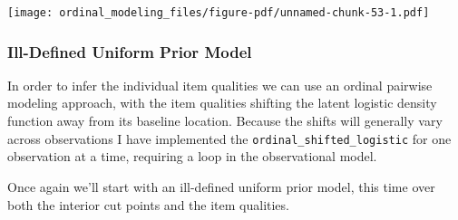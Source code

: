 \documentclass[
  letterpaper,
  DIV=11,
  numbers=noendperiod]{scrartcl}
\newenvironment{Shaded}{\begin{snugshade}}{\end{snugshade}}
\newcommand{\AttributeTok}[1]{\textcolor[rgb]{0.40,0.45,0.13}{#1}}
\newcommand{\ControlFlowTok}[1]{\textcolor[rgb]{0.00,0.23,0.31}{#1}}
\newcommand{\DecValTok}[1]{\textcolor[rgb]{0.68,0.00,0.00}{#1}}
\newcommand{\FloatTok}[1]{\textcolor[rgb]{0.68,0.00,0.00}{#1}}
\newcommand{\FunctionTok}[1]{\textcolor[rgb]{0.28,0.35,0.67}{#1}}
\newcommand{\NormalTok}[1]{\textcolor[rgb]{0.00,0.23,0.31}{#1}}
\newcommand{\SpecialCharTok}[1]{\textcolor[rgb]{0.37,0.37,0.37}{#1}}
\newcommand{\StringTok}[1]{\textcolor[rgb]{0.13,0.47,0.30}{#1}}
\begin{document}
\begin{Shaded}
\end{Shaded}

\texttt{[image: ordinal\_modeling\_files/figure-pdf/unnamed-chunk-53-1.pdf]}

\subsubsection{Ill-Defined Uniform Prior
Model}\label{ill-defined-uniform-prior-model}

In order to infer the individual item qualities we can use an ordinal
pairwise modeling approach, with the item qualities shifting the latent
logistic density function away from its baseline location. Because the
shifts will generally vary across observations I have implemented the
\texttt{ordinal\_shifted\_logistic} for one observation at a time,
requiring a loop in the observational model.

Once again we'll start with an ill-defined uniform prior model, this
time over both the interior cut points and the item qualities.
\end{document}
